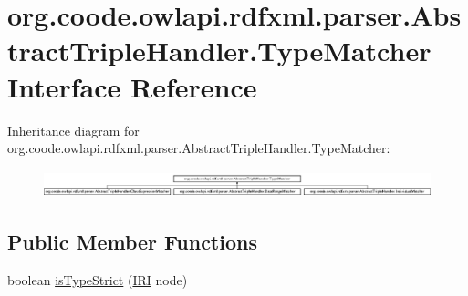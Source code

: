 \hypertarget{interfaceorg_1_1coode_1_1owlapi_1_1rdfxml_1_1parser_1_1_abstract_triple_handler_1_1_type_matcher}{\section{org.\-coode.\-owlapi.\-rdfxml.\-parser.\-Abstract\-Triple\-Handler.\-Type\-Matcher Interface Reference}
\label{interfaceorg_1_1coode_1_1owlapi_1_1rdfxml_1_1parser_1_1_abstract_triple_handler_1_1_type_matcher}
}
Inheritance diagram for org.\-coode.\-owlapi.\-rdfxml.\-parser.\-Abstract\-Triple\-Handler.\-Type\-Matcher\-:\begin{figure}[H]
\begin{center}
\leavevmode
\includegraphics[height=0.796020cm]{interfaceorg_1_1coode_1_1owlapi_1_1rdfxml_1_1parser_1_1_abstract_triple_handler_1_1_type_matcher}
\end{center}
\end{figure}
\subsection*{Public Member Functions}
\begin{DoxyCompactItemize}
\item 
boolean \hyperlink{interfaceorg_1_1coode_1_1owlapi_1_1rdfxml_1_1parser_1_1_abstract_triple_handler_1_1_type_matcher_a3799fbaf5170e1276c0da2839498c275}{is\-Type\-Strict} (\hyperlink{classorg_1_1semanticweb_1_1owlapi_1_1model_1_1_i_r_i}{I\-R\-I} node)
\end{DoxyCompactItemize}


